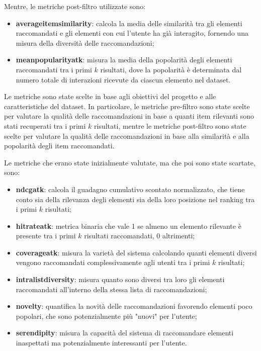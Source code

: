 Mentre, le metriche post-filtro utilizzate sono:
\begin{itemize}
    \item \textbf{\gls{averageitemsimilarity}}: calcola la media delle similarità tra gli elementi raccomandati e gli elementi con cui l'utente ha già interagito, fornendo una misura della diversità delle raccomandazioni;
    \item \textbf{\gls{meanpopularityatk}}: misura la media della popolarità degli elementi raccomandati tra i primi $k$ risultati, dove la popolarità è determinata dal numero totale di interazioni ricevute da ciascun elemento nel dataset.
\end{itemize}

Le metriche sono state scelte in base agli obiettivi del progetto e alle caratteristiche del dataset. In particolare, le metriche pre-filtro sono state scelte per valutare la qualità delle raccomandazioni in base a quanti item rilevanti sono stati recuperati tra i primi $k$ risultati, mentre le metriche post-filtro sono state scelte per valutare la qualità delle raccomandazioni in base alla similarità e alla popolarità degli item raccomandati.

Le metriche che erano state inizialmente valutate, ma che poi sono state scartate, sono:
\begin{itemize}
    \item \textbf{\gls{ndcgatk}}: calcola il guadagno cumulativo scontato normalizzato, che tiene conto sia della rilevanza degli elementi sia della loro posizione nel ranking tra i primi $k$ risultati;
    \item \textbf{\gls{hitrateatk}}: metrica binaria che vale 1 se almeno un elemento rilevante è presente tra i primi $k$ risultati raccomandati, 0 altrimenti;
    \item \textbf{\gls{coverageatk}}: misura la varietà del sistema calcolando quanti elementi diversi vengono raccomandati complessivamente agli utenti tra i primi $k$ risultati;
    \item \textbf{\gls{intralistdiversity}}: misura quanto sono diversi tra loro gli elementi raccomandati all'interno della stessa lista di raccomandazioni;
    \item \textbf{\gls{novelty}}: quantifica la novità delle raccomandazioni favorendo elementi poco popolari, che sono potenzialmente più "nuovi" per l'utente;
    \item \textbf{\gls{serendipity}}: misura la capacità del sistema di raccomandare elementi inaspettati ma potenzialmente interessanti per l'utente.
\end{itemize}

